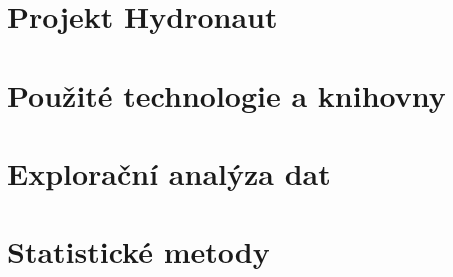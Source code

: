 

\section{Projekt Hydronaut}
\label{sec:projekt_hydronaut}


\section{Použité technologie a knihovny}
\label{sec:technologie_a_knihovny}


\section{Explorační analýza dat}
\label{sec:_exploracni_analyza}


\section{Statistické metody}
\label{sec:_statisticke_metody}


